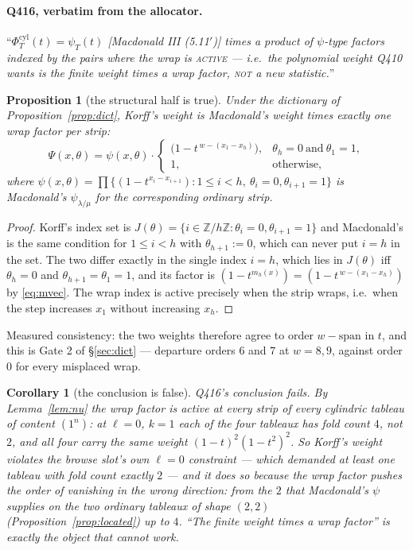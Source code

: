 \documentclass[11pt]{article}
\newtheorem{proposition}[theorem]{Proposition}
\newtheorem{corollary}[theorem]{Corollary}
\theoremstyle{definition}
\newcommand{\la}{\lambda}
\newcommand{\Z}{\mathbb{Z}}
\begin{document}
\paragraph{Q416, verbatim from the allocator.} ``\emph{$\Phi^{\mathrm{cyl}}_T(t)=
\psi_T(t)$ \textup{[Macdonald III (5.11$'$)]} times a product of $\psi$-type factors
indexed by the pairs where the wrap is \textsc{active} --- i.e.\ the polynomial weight
Q410 wants is the finite weight times a wrap factor, \textsc{not} a new statistic.}''

\begin{proposition}[the structural half is true]\label{prop:q416a}
Under the dictionary of Proposition~\ref{prop:dict}, Korff's weight is Macdonald's
weight times exactly one wrap factor per strip:
\[
 \Psi(x,\theta)=\psi(x,\theta)\cdot
 \begin{cases}
  \bigl(1-t^{\,w-(x_1-x_h)}\bigr), & \theta_h=0\ \text{and}\ \theta_1=1,\\
  1,&\text{otherwise},
 \end{cases}
\]
where $\psi(x,\theta)=\prod\{(1-t^{x_i-x_{i+1}}):1\le i<h,\ \theta_i=0,\theta_{i+1}=1\}$
is Macdonald's $\psi_{\la/\mu}$ for the corresponding ordinary strip.
\end{proposition}

\begin{proof}
Korff's index set is $J(\theta)=\{i\in\Z/h\Z:\theta_i=0,\theta_{i+1}=1\}$ and
Macdonald's is the same condition for $1\le i<h$ with $\theta_{h+1}:=0$, which can
never put $i=h$ in the set. The two differ exactly in the single index $i=h$, which
lies in $J(\theta)$ iff $\theta_h=0$ and $\theta_{h+1}=\theta_1=1$, and its factor is
$(1-t^{m_h(x)})=(1-t^{\,w-(x_1-x_h)})$ by \eqref{eq:mvec}. The wrap index is active
precisely when the strip wraps, i.e.\ when the step increases $x_1$ without increasing
$x_h$.
\end{proof}

Measured consistency: the two weights therefore agree to order $w-\mathrm{span}$ in
$t$, and this is Gate 2 of \S\ref{sec:dict} --- departure orders $6$ and $7$ at
$w=8,9$, against order $0$ for every misplaced wrap.

\begin{corollary}[the conclusion is false]\label{cor:q416b}
Q416's conclusion fails. By Lemma~\ref{lem:nu} the wrap factor is active at
\emph{every} strip of \emph{every} cylindric tableau of content $(1^{n})$: at
$\ell=0$, $k=1$ each of the four tableaux has fold count $4$, not $2$, and all four
carry the same weight $(1-t)^{2}(1-t^{2})^{2}$. So Korff's weight violates the
browse slot's own $\ell=0$ constraint --- which demanded at least one tableau with
fold count exactly $2$ --- and it does so because the wrap factor pushes the order of
vanishing in the \emph{wrong direction}: from the $2$ that Macdonald's $\psi$ supplies
on the two ordinary tableaux of shape $(2,2)$ \textup{(Proposition~\ref{prop:located})}
up to $4$. ``The finite weight times a wrap factor'' is exactly the object that cannot
work.
\end{corollary}
\end{document}
